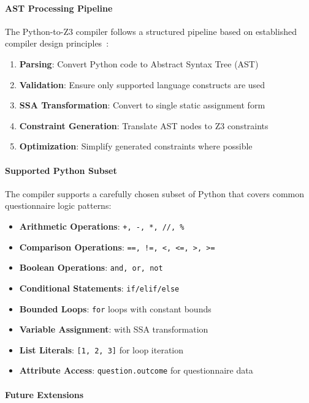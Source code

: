 \paragraph{AST Processing Pipeline}

The Python-to-Z3 compiler follows a structured pipeline based on established compiler design principles~\cite{aho2006compilers}:

\begin{enumerate}
    \item \textbf{Parsing}: Convert Python code to Abstract Syntax Tree (AST)
    \item \textbf{Validation}: Ensure only supported language constructs are used
    \item \textbf{SSA Transformation}: Convert to single static assignment form
    \item \textbf{Constraint Generation}: Translate AST nodes to Z3 constraints
    \item \textbf{Optimization}: Simplify generated constraints where possible
\end{enumerate}

\paragraph{Supported Python Subset}

The compiler supports a carefully chosen subset of Python that covers common questionnaire logic patterns:

\begin{itemize}
    \item \textbf{Arithmetic Operations}: \texttt{+, -, *, //, \%}
    \item \textbf{Comparison Operations}: \texttt{==, !=, <, <=, >, >=}
    \item \textbf{Boolean Operations}: \texttt{and, or, not}
    \item \textbf{Conditional Statements}: \texttt{if/elif/else}
    \item \textbf{Bounded Loops}: \texttt{for} loops with constant bounds
    \item \textbf{Variable Assignment}: with SSA transformation
    \item \textbf{List Literals}: \texttt{[1, 2, 3]} for loop iteration
    \item \textbf{Attribute Access}: \texttt{question.outcome} for questionnaire data
\end{itemize}

\paragraph{Future Extensions}

